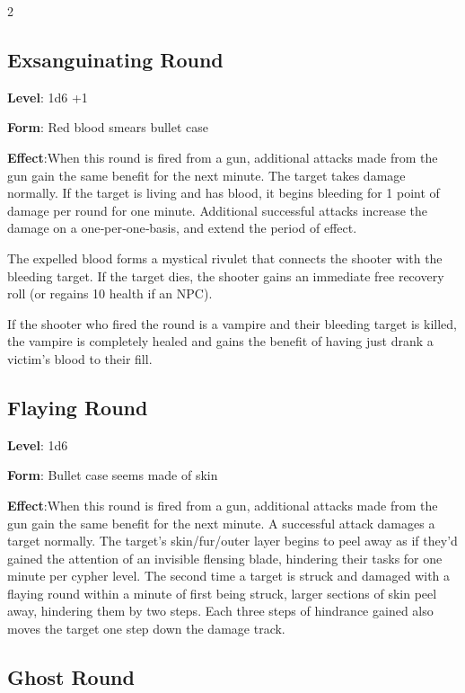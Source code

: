\begin{multicols}{2}
\subsection{Exsanguinating Round}

\textbf{Level}: 1d6 +1 

\textbf{Form}: Red blood smears bullet case 

\textbf{Effect}:When this round is fired from a gun, additional attacks made from the gun gain the same benefit for the next minute. The target takes damage normally. If the target is living and has blood, it begins bleeding for 1 point of damage per round for one minute. Additional successful attacks increase the damage on a one‑per‑one‑basis, and extend the period of effect. 

The expelled blood forms a mystical rivulet that connects the shooter with the bleeding target. If the target dies, the shooter gains an immediate free recovery roll (or regains 10 health if an NPC). 

If the shooter who fired the round is a vampire and their bleeding target is killed, the vampire is completely healed and gains the benefit of having just drank a victim’s blood to their fill.

\subsection{Flaying Round} 

\textbf{Level}: 1d6 

\textbf{Form}: Bullet case seems made of skin 

\textbf{Effect}:When this round is fired from a gun, additional attacks made from the gun gain the same benefit for the next minute. A successful attack damages a target normally. The target’s skin/fur/outer layer begins to peel away as if they’d gained the attention of an invisible flensing blade, hindering their tasks for one minute per cypher level. The second time a target is struck and damaged with a flaying round within a minute of first being struck, larger sections of skin peel away, hindering them by two steps. Each three steps of hindrance gained also moves the target one step down the damage track.

\subsection{Ghost Round}


\end{multicols}
